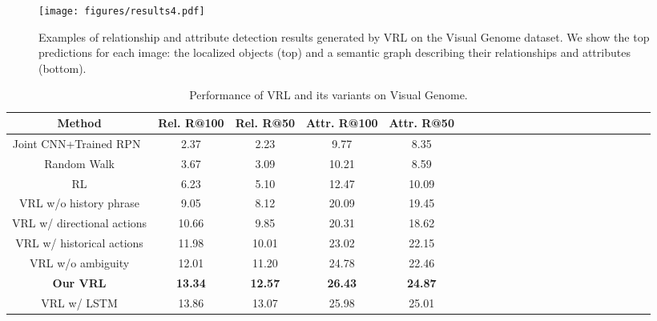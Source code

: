 \documentclass[10pt,twocolumn,letterpaper]{article}
\begin{document}
\begin{figure*}[!tp]
	\begin{center}
		\texttt{[image: figures/results4.pdf]}
		\caption{{Examples of relationship and attribute detection results generated by {VRL} on the Visual Genome dataset. We show the top predictions for each image: the localized objects (top) and a semantic graph describing their relationships and attributes (bottom).}}
		\label{fig:results}
	\end{center}
	\vspace{-8mm}
\end{figure*}


\begin{table}[!tp]\setlength{\tabcolsep}{2pt}
	\centering\scriptsize
	\caption{Performance {of VRL} and its variants on Visual Genome.}\label{tab:variants}
	\begin{tabular}{c|c|c|c|cccccccccccccccccc}
		\toprule
		{Method} &  Rel. R@100 & Rel. R@50 & Attr. R@100 & Attr. R@50 \\
		\midrule
		Joint CNN+Trained RPN~\cite{ren2015faster} & {2.37} & 2.23 & {9.77} & 8.35\\
		\midrule
		Random Walk & {3.67} & {3.09} & {10.21} & {8.59}\\
		\midrule
		RL & {6.23} & {5.10} & {12.47} & {10.09}\\
		\midrule
		{VRL w/o history phrase} & {9.05} & {8.12} & {20.09} & {19.45}  \\
		\midrule
		{VRL w/ directional actions} & {10.66} & {9.85} & {20.31} & {18.62} 
		\\ 
		\midrule
		{VRL {w/ historical} actions} & {11.98} & {10.01} & {23.02} & {22.15}  \\
		\midrule
		{VRL w/o ambiguity} & {12.01} & {11.20} & {24.78} & {22.46}  \\
		\midrule
		\textbf{Our VRL} & \textbf{13.34} & \textbf{12.57} & \textbf{26.43} & \textbf{24.87}  \\
		\midrule
		{{VRL} w/ LSTM} & {13.86} & {13.07} & {25.98} & {25.01}  \\
		\bottomrule
	\end{tabular}\vspace{-6mm}
\end{table}
\end{document}
